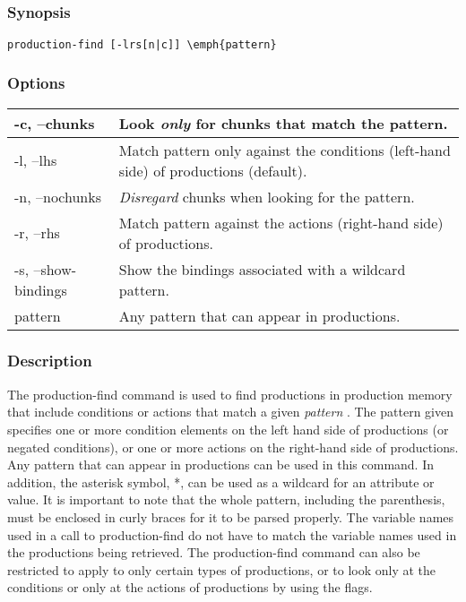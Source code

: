\subsection{}
\label{production-find}
\subsubsection*{Synopsis}
\begin{verbatim}
production-find [-lrs[n|c]] \emph{pattern}
\end{verbatim}
\subsubsection*{Options}
\begin{tabular}{|l|l|}
\hline 
 -c, --chunks  & Look \emph{only}
 for chunks that match the pattern.  \\
 \hline 
 -l, --lhs  & Match pattern only against the conditions (left-hand side) of productions (default).  \\
 \hline 
 -n, --nochunks  &\emph{Disregard}
 chunks when looking for the pattern.  \\
 \hline 
 -r, --rhs  & Match pattern against the actions (right-hand side) of productions.  \\
 \hline 
 -s, --show-bindings  & Show the bindings associated with a wildcard pattern.  \\
 \hline 
 pattern  & Any pattern that can appear in productions.  \\
 \hline 
\end{tabular}
\subsubsection*{Description}
 The production-find command is used to find productions in production memory that include conditions or actions that match a given \emph{pattern}
. The pattern given specifies one or more condition elements on the left hand side of productions (or negated conditions), or one or more actions on the right-hand side of productions. Any pattern that can appear in productions can be used in this command. In addition, the asterisk symbol, *, can be used as a wildcard for an attribute or value. It is important to note that the whole pattern, including the parenthesis, must be enclosed in curly braces for it to be parsed properly. 
 The variable names used in a call to production-find do not have to match the variable names used in the productions being retrieved. 
 The production-find command can also be restricted to apply to only certain types of productions, or to look only at the conditions or only at the actions of productions by using the flags. 
